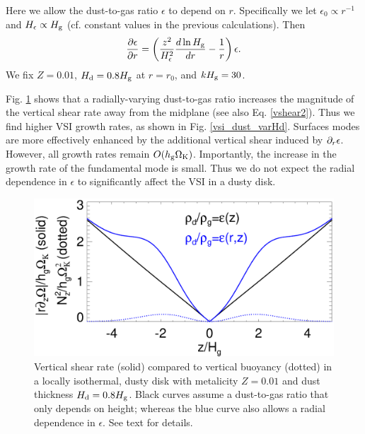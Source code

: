 Here we allow the dust-to-gas ratio $\epsilon$ to depend on
$r$. Specifically we let $\epsilon_0\propto r^{-1}$ and
$H_\epsilon \propto H_\mathrm{g}$ (cf. constant values in the previous
calculations). Then
\begin{align*}
  \frac{\partial\epsilon}{\partial r} =
  \left(\frac{z^2}{H_\epsilon^2}\frac{d\ln{H_\mathrm{g}}}{dr} -
    \frac{1}{r}\right)\epsilon.   
\end{align*}
We fix $Z=0.01$, $H_\mathrm{d}=0.8H_\mathrm{g}$ at $r=r_0$, and
$kH_\mathrm{g}=30$.      

Fig. \ref{compare_vshear_varHd} shows that a radially-varying
dust-to-gas ratio increases the magnitude of the vertical shear rate
away from the midplane (see also Eq. \ref{vshear2}). Thus we find
higher VSI growth rates, as shown in Fig. \ref{vsi_dust_varHd}. 
Surfaces modes are more effectively enhanced by the additional vertical 
shear induced by $\partial_r\epsilon$. However, all growth rates remain
$O(h_\mathrm{g}\Omega_{\rm K})$. Importantly, the increase in the growth rate of the
fundamental mode is small. Thus we do not expect the radial
dependence in $\epsilon$ to significantly affect the VSI in a dusty
disk. 

\begin{figure}
  \includegraphics[width=\linewidth]{figures/compare_vshear_Nz2_varHd} 
  \caption{Vertical shear rate (solid) compared to vertical buoyancy
    (dotted) in a locally isothermal, dusty disk 
    with metalicity $Z=0.01$ and dust thickness $H_\mathrm{d}=0.8H_\mathrm{g}$.
    Black curves assume a dust-to-gas ratio that only depends on
    height; whereas the blue curve also allows a radial dependence in
    $\epsilon$. See text for details.  
    \label{compare_vshear_varHd}
    }
\end{figure}



